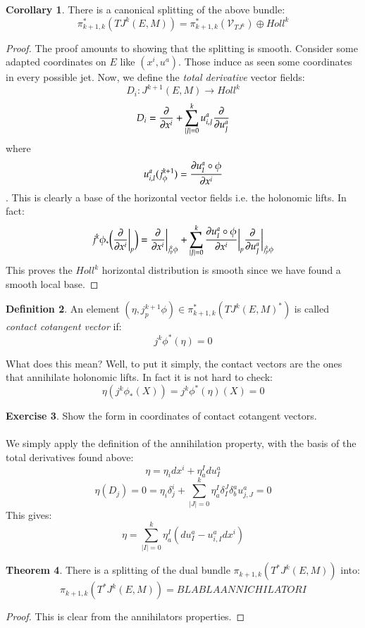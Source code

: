 \documentclass[12pt,a4paper]{report}
\theoremstyle{definition}
\newtheorem{Def}{Definition}[chapter]
\theoremstyle{Theorem}
\newtheorem{Theo}[Def]{Theorem}
\theoremstyle{break}
\newtheorem{Exe}[Def]{Exercise}
\theoremstyle{definition}
\newtheorem{Cor}[Def]{Corollary}
\begin{document}
		\begin{Cor}
			There is a canonical splitting of the above bundle:
			$$\pi_{k+1,k}^*(TJ^k(E,M))=\pi_{k+1,k}^*(\mathcal{V}_{TJ^k})\oplus Holl^k$$
		\end{Cor}
		\begin{proof}
			The proof amounts to showing that the splitting is smooth. Consider some adapted coordinates on $E$ like $(x^i,u^a)$. Those induce as seen some coordinates in every possible jet. Now, we define the \textit{total derivative} vector fields:
			$$D_i:J^{k+1}(E,M)\rightarrow Holl^k$$
			$$D_i={\partial \over \partial x^i}+\sum_{|J|=0}^ku^a_{i,J}{\partial \over \partial u^a_J}$$
			where $$u^a_{i,I}(j^{k+1}_\phi)={\partial u^a_I\circ \phi\over \partial x^i}$$.
			This is clearly a base of the horizontal vector fields i.e. the holonomic lifts. In fact:
			$$j^k\phi_*\bigg({\partial\over \partial x^i}\bigg|_p\bigg)={\partial \over \partial x^i}\bigg|_{j^k_p\phi}+\sum_{|J|=0}^k{\partial u^a_I\circ \phi\over \partial x^i}\bigg|_p{\partial \over \partial u^a_J}\bigg|_{j^k_p\phi}$$
			This proves the $Holl^k$ horizontal distribution is smooth since we have found a smooth local base. 
		\end{proof}
		\begin{Def}
			An element $(\eta,j_p^{k+1}\phi)\in \pi_{k+1,k}^*(TJ^k(E,M)^*)$ is called \textit{contact cotangent vector} if:
			$$j^k\phi^*(\eta)=0$$
		\end{Def}
		What does this mean? Well, to put it simply, the contact vectors are the ones that annihilate holonomic lifts. In fact it is not hard to check:
		$$\eta(j^k\phi_*(X))=j^k\phi^*(\eta)(X)=0$$
		\begin{Exe}
			Show the form in coordinates of contact cotangent vectors.\\
			\\
			We simply apply the definition of the annihilation property, with the basis of the total derivatives found above:
			$$\eta=\eta_idx^i+\eta_a^Idu^a_I$$
			$$\eta(D_j)=0=\eta_i\delta^i_j+\sum_{|J|=0}^k\eta_a^I\delta_I^J\delta^a_b u^a_{j,J}=0$$
			This gives:
			$$\eta=\sum_{|I|=0}^k\eta_a^I(du^a_I- u^a_{i,I}dx^i)$$
		\end{Exe}
		\begin{Theo}
			There is a splitting of the dual bundle $\pi_{k+1,k}(T^*J^k(E,M))$ into:
			$$\pi_{k+1,k}(T^*J^k(E,M))=BLABLA ANNICHILATORI$$
		\end{Theo}
		\begin{proof}
			This is clear from the annihilators properties.
		\end{proof}
\end{document}
